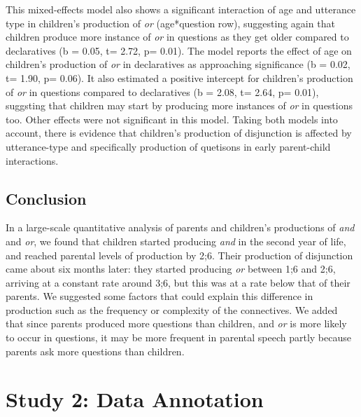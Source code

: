 \documentclass[
  english,
  ,man,floatsintext]{apa6}
\begin{document}
This mixed-effects model also shows a significant interaction of age and utterance type in children's production of \emph{or} (age*question row), suggesting again that children produce more instance of \emph{or} in questions as they get older compared to declaratives (b = 0.05, t= 2.72, p= 0.01). The model reports the effect of age on children's production of \emph{or} in declaratives as approaching significance (b = 0.02, t= 1.90, p= 0.06). It also estimated a positive intercept for children's production of \emph{or} in questions compared to declaratives (b = 2.08, t= 2.64, p= 0.01), suggsting that children may start by producing more instances of \emph{or} in questions too. Other effects were not significant in this model. Taking both models into account, there is evidence that children's production of disjunction is affected by utterance-type and specifically production of quetisons in early parent-child interactions.

\hypertarget{study1discussion}{%
\subsection{Conclusion}\label{study1discussion}}

In a large-scale quantitative analysis of parents and children's productions of \emph{and} and \emph{or}, we found that children started producing \emph{and} in the second year of life, and reached parental levels of production by 2;6. Their production of disjunction came about six months later: they started producing \emph{or} between 1;6 and 2;6, arriving at a constant rate around 3;6, but this was at a rate below that of their parents. We suggested some factors that could explain this difference in production such as the frequency or complexity of the connectives. We added that since parents produced more questions than children, and \emph{or} is more likely to occur in questions, it may be more frequent in parental speech partly because parents ask more questions than children.

\hypertarget{study-2-data-annotation}{%
\section{Study 2: Data Annotation}\label{study-2-data-annotation}}
\end{document}
